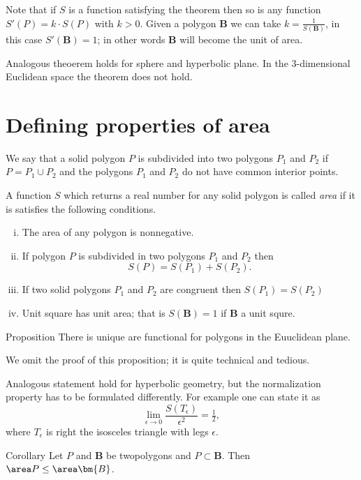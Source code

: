 {Note that if $S$ is a function satisfying the theorem then so is any function $S'(P)=k\cdot S(P)$ with $k>0$.
Given a polygon $\bm{B}$ we can take $k=\tfrac{1}{S(\bm{B})}$,
in this case $S'(\bm{B})=1$;
in other words $\bm{B}$ will become the unit of area.

Analogous theoerem holds for sphere and hyperbolic plane.
In the $3$-dimensional Euclidean space the theorem does not hold.


\section*{Defining properties of area}

We say that a solid polygon $P$ is subdivided 
into two polygons $P_1$ and $P_2$ 
if $P=P_1\cup P_2$ 
and the polygons $P_1$ and $P_2$ do not have common interior points. 

A function $S$ 
which returns a real number for any solid polygon is called \emph{area}
if it is satisfies the following conditions.

\begin{enumerate}[(i)]
\item\label{area:positive} The area of any polygon is nonnegative.
\item\label{area:additive} If polygon $P$ is subdivided in two polygons $P_1$ and $P_2$ then 
\[S(P)=S(P_1)+S(P_2).\]
\item\label{area:equal} If two solid polygons $P_1$ and $P_2$ are congruent then $S(P_1)=S(P_2)$
\item\label{area:unit} Unit square has unit area; that is $S(\bm{B})=1$ if $\bm{B}$ a unit squre.
\end{enumerate}


\begin{thm}{Proposition}
There is unique are functional for polygons in the Euuclidean plane. 
\end{thm}

We omit the proof of this proposition;
it is quite technical and tedious. 

Analogous statement hold for hyperbolic geometry, but the normalization property has to be formulated differently.
For example one can state it as 
\[\lim_{\epsilon\to0}\frac{S(T_\epsilon)}{\epsilon^2}=\tfrac12,\]
where 
$T_\epsilon$ is right the isosceles triangle with legs $\epsilon$.


\begin{thm}{Corollary}
Let $P$ and $\bm{B}$ be twopolygons and $P\subset \bm{B}$.
Then $\area P\le \area \bm{B}$.
\end{thm}

}
